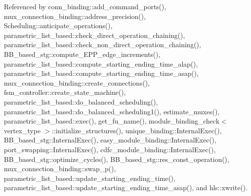 Referenced by conn\+\_\+binding\+::add\+\_\+command\+\_\+ports(), mux\+\_\+connection\+\_\+binding\+::address\+\_\+precision(), Scheduling\+::anticipate\+\_\+operations(), parametric\+\_\+list\+\_\+based\+::check\+\_\+direct\+\_\+operation\+\_\+chaining(), parametric\+\_\+list\+\_\+based\+::check\+\_\+non\+\_\+direct\+\_\+operation\+\_\+chaining(), B\+B\+\_\+based\+\_\+stg\+::compute\+\_\+\+E\+P\+P\+\_\+edge\+\_\+increments(), parametric\+\_\+list\+\_\+based\+::compute\+\_\+starting\+\_\+ending\+\_\+time\+\_\+alap(), parametric\+\_\+list\+\_\+based\+::compute\+\_\+starting\+\_\+ending\+\_\+time\+\_\+asap(), mux\+\_\+connection\+\_\+binding\+::create\+\_\+connections(), fsm\+\_\+controller\+::create\+\_\+state\+\_\+machine(), parametric\+\_\+list\+\_\+based\+::do\+\_\+balanced\+\_\+scheduling(), parametric\+\_\+list\+\_\+based\+::do\+\_\+balanced\+\_\+scheduling1(), estimate\+\_\+muxes(), parametric\+\_\+list\+\_\+based\+::exec(), get\+\_\+fu\+\_\+name(), module\+\_\+binding\+\_\+check$<$ vertex\+\_\+type $>$\+::initialize\+\_\+structures(), unique\+\_\+binding\+::\+Internal\+Exec(), B\+B\+\_\+based\+\_\+stg\+::\+Internal\+Exec(), easy\+\_\+module\+\_\+binding\+::\+Internal\+Exec(), port\+\_\+swapping\+::\+Internal\+Exec(), cdfc\+\_\+module\+\_\+binding\+::\+Internal\+Exec(), B\+B\+\_\+based\+\_\+stg\+::optimize\+\_\+cycles(), B\+B\+\_\+based\+\_\+stg\+::res\+\_\+const\+\_\+operation(), mux\+\_\+connection\+\_\+binding\+::swap\+\_\+p(), parametric\+\_\+list\+\_\+based\+::update\+\_\+starting\+\_\+ending\+\_\+time(), parametric\+\_\+list\+\_\+based\+::update\+\_\+starting\+\_\+ending\+\_\+time\+\_\+asap(), and hls\+::xwrite().

